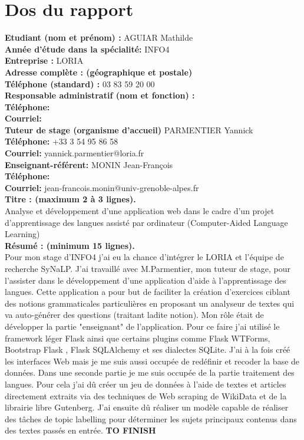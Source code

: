 \section{Dos du rapport}

\textbf{Etudiant (nom et prénom) :} AGUIAR Mathilde \\
\textbf{Année d’étude dans la spécialité:} INFO4 \\

\textbf{Entreprise :} LORIA \\
\textbf{Adresse complète : (géographique et postale)} \\
\textbf{Téléphone (standard) :} 03 83 59 20 00 \\

\textbf{Responsable administratif (nom et fonction) :}\\
\textbf{Téléphone:} \\
\textbf{Courriel:}\\

\textbf{Tuteur de stage (organisme d’accueil)} PARMENTIER Yannick\\
\textbf{Téléphone:} +33 3 54 95 86 58 \\
\textbf{Courriel:} yannick.parmentier@loria.fr \\

\textbf{Enseignant-référent:} MONIN Jean-François \\
\textbf{Téléphone:} \\
\textbf{Courriel:} jean-francois.monin@univ-grenoble-alpes.fr \\

\textbf{Titre : (maximum 2 à 3 lignes).} \\
Analyse et développement d’une application web dans le cadre d’un projet
d’apprentissage des langues assisté par ordinateur (Computer-Aided Language
Learning) \\
\textbf{Résumé : (minimum 15 lignes).}\\
Pour mon stage d’INFO4 j’ai eu la chance d’intégrer le LORIA et l’équipe de recherche SyNaLP. J’ai travaillé avec M.Parmentier, mon tuteur de stage, pour l’assister dans le développement d’une application d’aide à l’apprentissage des langues. Cette application a pour but de faciliter la création d’exercices ciblant des notions grammaticales particulières en proposant un analyseur de textes qui va auto-générer des questions (traitant ladite notion). 
Mon rôle était de développer la partie "enseignant" de l’application. Pour ce faire j’ai utilisé le framework léger Flask ainsi que certains plugins comme Flask WTForms, Bootstrap Flask , Flask SQLAlchemy et ses dialectes SQLite. J’ai à la fois créé les interfaces Web mais je me suis aussi occupée de redéfinir et recoder la base de données. 
Dans une seconde partie je me suis occupée de la partie traitement des langues. Pour cela j'ai dû créer un jeu de données à l'aide de textes et articles directement extraits via des techniques de Web scraping de WikiData et de la librairie libre Gutenberg. J'ai ensuite dû réaliser un modèle capable de réaliser des tâches de topic labelling pour déterminer les sujets principaux contenus dans des textes passés en entrée. 
 \textbf{TO FINISH}



